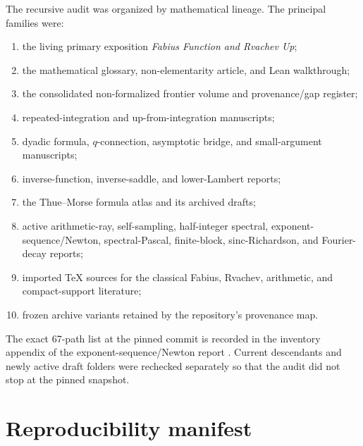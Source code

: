 \documentclass[11pt,oneside]{article}
\theoremstyle{definition}
\theoremstyle{remark}
\newcommand{\1}{\mathbf 1}
\begin{document}
The recursive audit was organized by mathematical lineage.  The principal
families were:
\begin{enumerate}
\item the living primary exposition \emph{Fabius Function and Rvachev Up};
\item the mathematical glossary, non-elementarity article, and Lean walkthrough;
\item the consolidated non-formalized frontier volume and provenance/gap register;
\item repeated-integration and up-from-integration manuscripts;
\item dyadic formula, \(q\)-connection, asymptotic bridge, and small-argument
      manuscripts;
\item inverse-function, inverse-saddle, and lower-Lambert reports;
\item the Thue--Morse formula atlas and its archived drafts;
\item active arithmetic-ray, self-sampling, half-integer spectral, exponent-
      sequence/Newton, spectral-Pascal, finite-block, sinc-Richardson, and
      Fourier-decay reports;
\item imported TeX sources for the classical Fabius, Rvachev, arithmetic, and
      compact-support literature;
\item frozen archive variants retained by the repository's provenance map.
\end{enumerate}
The exact 67-path list at the pinned commit is recorded in the inventory appendix
of the exponent-sequence/Newton report \cite{p8:proveitNewton}.  Current descendants
and newly active draft folders were rechecked separately so that the audit did
not stop at the pinned snapshot.

\section{Reproducibility manifest}
\label{p8:app:manifest}
\end{document}
